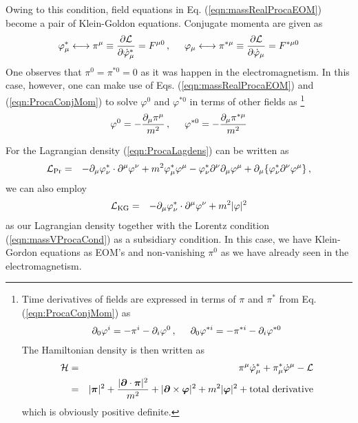 Owing to this condition, field equations in Eq. (\ref{eqn:massRealProcaEOM})
become a pair of Klein-Goldon equations.
Conjugate momenta are given as
\begin{eqnarray}
\varphi^*_\mu
\longleftrightarrow
\pi^\mu 
 \equiv \frac{
\partial {\cal L} }
{\partial \dot{\varphi}_\mu^*}
= F^{\mu 0}
\,,
\hspace{5mm}
\varphi_\mu
\longleftrightarrow
\pi^{* \mu} 
\equiv \frac{
\partial {\cal L} }
{\partial \dot{\varphi}_\mu}
= F^{*\mu 0}
\label{eqn:ProcaConjMom}
\end{eqnarray}
One observes that $\pi^0 = \pi^{*0} = 0$ as it was happen in the electromagnetism.
In this case, however, one can make use of Eqs. (\ref{eqn:massRealProcaEOM}) and
(\ref{eqn:ProcaConjMom}) to solve $\varphi^0$ and $\varphi^{*0}$ 
in terms of other fields as
\footnote{%
Time derivatives of fields are expressed in terms of $\pi$ and $\pi^*$ from
Eq. (\ref{eqn:ProcaConjMom}) as
\begin{eqnarray*}
\partial_0 \varphi^i = - \pi^i - \partial_i \varphi^0
\,,
\hspace{5mm}
\partial_0 \varphi^{*i} = - \pi^{*i} - \partial_i \varphi^{*0}
\end{eqnarray*}
The Hamiltonian density is then written as
\begin{eqnarray*}
\mathcal{H}
&=&
\pi^\mu \dot{\varphi}^*_\mu + \pi^*_\mu \dot{\varphi}^\mu - \mathcal{L}
\nonumber\\
&=&
|\mbox{\boldmath $\pi$}|^2
+
\frac{|\mbox{\boldmath $\partial$}\cdot \mbox{\boldmath $\pi$}|^2}{m^2}
+
|\mbox{\boldmath $\partial$} \times \mbox{\boldmath $\varphi$}|^2
+
m^2 |\mbox{\boldmath $\varphi$}|^2
+ 
\mbox{total derivative}
\end{eqnarray*}
which is obviously positive definite.
}%
\begin{eqnarray}
\varphi^0 
=
- \frac{\partial_\mu \pi^\mu}{m^2}
\,,
\hspace{5mm}
\varphi^{*0 }
=
- \frac{\partial_\mu \pi^{*\mu}}{m^2}
\end{eqnarray}

For the Lagrangian density (\ref{eqn:ProcaLagdens}) can be written as
\begin{eqnarray}
{\cal L}_{\mbox{\scriptsize Pr}} &=&
- \partial_\mu \varphi_\nu^* \cdot \partial^\mu \varphi^\nu
+ m^2 \varphi_\mu^* \varphi^\mu
- \varphi_\nu^*\partial^\nu 
\partial_\mu \varphi^\mu
+ \partial_\mu \{ \varphi_\nu^*\partial^\nu  \varphi^\mu \}
\,,
\end{eqnarray}
we can also employ
\begin{eqnarray}
\mathcal{L}_{\mbox{\scriptsize KG}}
&=&
- \partial_\mu \varphi_\nu^* \cdot \partial^\mu \varphi^\nu 
 + m^2 |\varphi|^2
\end{eqnarray}
as our Lagrangian density
together with the Lorentz condition (\ref{eqn:massVProcaCond})
as a subsidiary condition.
In this case, we have Klein-Gordon equations as EOM's and
non-vanishing $\pi^0$ as we have already seen in the electromagnetism.


